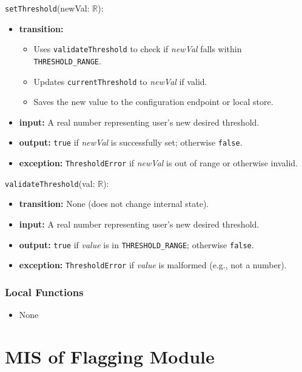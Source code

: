 \documentclass[12pt, titlepage]{article}
\begin{document}
\noindent \texttt{setThreshold}(newVal: $\mathbb{R}$):
\begin{itemize}
    \item \textbf{transition:}
    \begin{itemize}
        \item Uses \texttt{validateThreshold} to check if \textit{newVal} falls within \texttt{THRESHOLD\_RANGE}.
        \item Updates \texttt{currentThreshold} to \textit{newVal} if valid.
        \item Saves the new value to the configuration endpoint or local store.
    \end{itemize}
    \item \textbf{input:} A real number representing user's new desired threshold.
    \item \textbf{output:} \texttt{true} if \textit{newVal} is successfully set; otherwise \texttt{false}.
    \item \textbf{exception:} \texttt{ThresholdError} if \textit{newVal} is out of range or otherwise invalid.
\end{itemize}

\noindent \texttt{validateThreshold}(val: $\mathbb{R}$):
\begin{itemize}
    \item \textbf{transition:} None (does not change internal state).
    \item \textbf{input:} A real number representing user's new desired threshold.
    \item \textbf{output:} \texttt{true} if \textit{value} is in \texttt{THRESHOLD\_RANGE}; otherwise \texttt{false}.
    \item \textbf{exception:} \texttt{ThresholdError} if \textit{value} is malformed (e.g., not a number).
\end{itemize}

\subsubsection{Local Functions}

\begin{itemize}
    \item None
\end{itemize}


\section{MIS of Flagging Module} \label{mFlagging}
\end{document}
